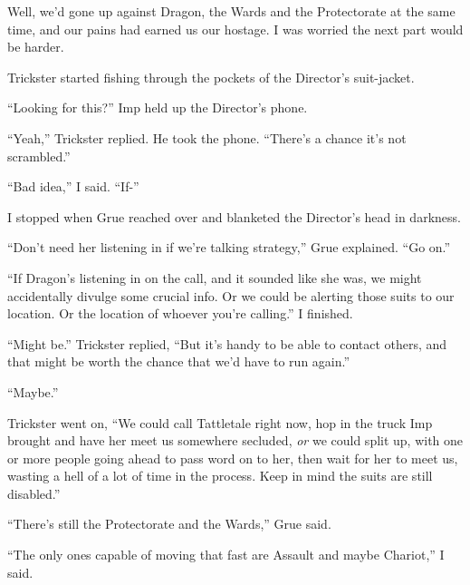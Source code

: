 





Well, we'd gone up against Dragon, the Wards and the Protectorate at the same time, and our pains had earned us our hostage.  I was worried the next part would be harder.



Trickster started fishing through the pockets of the Director's suit-jacket.



``Looking for this?'' Imp held up the Director's phone.



``Yeah,'' Trickster replied.  He took the phone.  ``There's a chance it's not scrambled.''



``Bad idea,'' I said.  ``If-''



I stopped when Grue reached over and blanketed the Director's head in darkness.



``Don't need her listening in if we're talking strategy,'' Grue explained.  ``Go on.''



``If Dragon's listening in on the call, and it sounded like she was, we might accidentally divulge some crucial info.  Or we could be alerting those suits to our location.  Or the location of whoever you're calling.''  I finished.



``Might be.'' Trickster replied, ``But it's handy to be able to contact others, and that might be worth the chance that we'd have to run again.''



``Maybe.''



Trickster went on, ``We could call Tattletale right now, hop in the truck Imp brought and have her meet us somewhere secluded, \emph{or} we could split up, with one or more people going ahead to pass word on to her, then wait for her to meet us, wasting a hell of a lot of time in the process.  Keep in mind the suits are still disabled.''



``There's still the Protectorate and the Wards,'' Grue said.



``The only ones capable of moving that fast are Assault and maybe Chariot,'' I said.



